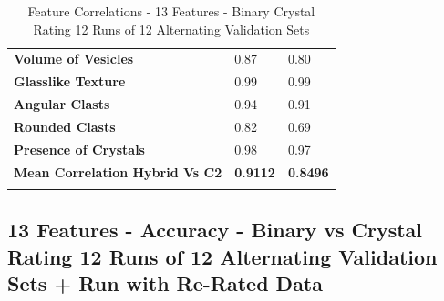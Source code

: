 \begin{longtable}[c]{@{}lll@{}}
\textbf{Volume of Vesicles} &
  \cellcolor[HTML]{ACB9CA}0.87 &
  \cellcolor[HTML]{FFE699}0.80 \\
\textbf{Glasslike Texture} &
  \cellcolor[HTML]{ACB9CA}0.99 &
  \cellcolor[HTML]{FFE699}0.99 \\
\textbf{Angular Clasts} &
  \cellcolor[HTML]{ACB9CA}0.94 &
  \cellcolor[HTML]{FFE699}0.91 \\
\textbf{Rounded Clasts} &
  \cellcolor[HTML]{ACB9CA}0.82 &
  \cellcolor[HTML]{FFE699}0.69 \\
\textbf{Presence of Crystals} &
  \cellcolor[HTML]{ACB9CA}0.98 &
  \cellcolor[HTML]{FFE699}0.97 \\
\cellcolor[HTML]{FFFF00}\textbf{Mean   Correlation Hybrid Vs C2} &
  \textbf{0.9112} &
  \textbf{0.8496}
  \\
\caption{Feature Correlations - 13 Features - Binary Crystal Rating 12 Runs of 12 Alternating Validation Sets}
\label{Feature Correlations - 13 Features - Binary Crystal Rating 12 Runs of 12 Alternating Validation Sets}\\
\end{longtable}

\newpage
\subsection{13 Features - Accuracy - Binary vs Crystal Rating 12 Runs of 12 Alternating Validation Sets + Run with Re-Rated Data}

